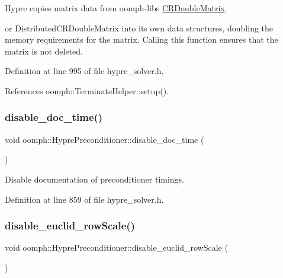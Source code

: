 Hypre copies matrix data from oomph-\/lib\textquotesingle{}s \hyperlink{classoomph_1_1CRDoubleMatrix}{C\+R\+Double\+Matrix}. 

or Distributed\+C\+R\+Double\+Matrix into its own data structures, doubling the memory requirements for the matrix. Calling this function ensures that the matrix is not deleted. 

Definition at line 995 of file hypre\+\_\+solver.\+h.



References oomph\+::\+Terminate\+Helper\+::setup().

\mbox{\label{classoomph_1_1HyprePreconditioner_a7b28624e54907dc5081484842b8b8530}} 
\subsubsection{\texorpdfstring{disable\+\_\+doc\+\_\+time()}{disable\_doc\_time()}}
{\footnotesize\ttfamily void oomph\+::\+Hypre\+Preconditioner\+::disable\+\_\+doc\+\_\+time (\begin{DoxyParamCaption}{ }\end{DoxyParamCaption})\hspace{0.3cm}{\ttfamily [inline]}}



Disable documentation of preconditioner timings. 



Definition at line 859 of file hypre\+\_\+solver.\+h.

\mbox{\label{classoomph_1_1HyprePreconditioner_a96f90cbfd3e92251707872391c3d66ab}} 
\subsubsection{\texorpdfstring{disable\+\_\+euclid\+\_\+row\+Scale()}{disable\_euclid\_rowScale()}}
{\footnotesize\ttfamily void oomph\+::\+Hypre\+Preconditioner\+::disable\+\_\+euclid\+\_\+row\+Scale (\begin{DoxyParamCaption}{ }\end{DoxyParamCaption})\hspace{0.3cm}{\ttfamily [inline]}}



